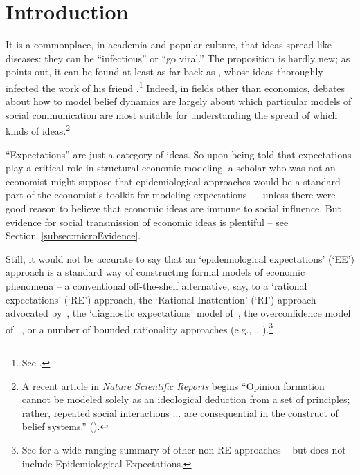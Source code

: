 \section{Introduction}
\label{chap1:sec1}

It is a commonplace, in academia and popular culture, that ideas spread like diseases: they can be ``infectious'' or ``go viral.''  The proposition is hardly new; as \cite{shiller2017narrative} points out, it can be found at least as far back as \cite{humeenquiry}, whose ideas thoroughly infected the work of his friend \cite{smithwealth}.\footnote{See \cite{rasmussen2017infidel}.} Indeed, in fields other than economics, debates about how to model belief dynamics are largely about which particular models of social communication are most suitable for understanding the spread of which kinds of ideas.\footnote{A recent article in \textit{Nature Scientific Reports} begins ``Opinion formation cannot be modeled solely as an ideological deduction from a set of principles; rather, repeated social interactions ... are consequential in the construct of belief systems.'' (\cite{nedic2019graph}).}

``Expectations'' are just a category of ideas.  So upon being told that expectations play a critical role in structural economic modeling, a scholar who was not an economist might suppose that epidemiological approaches would be a standard part of the economist's toolkit for modeling expectations --- unless there were good reason to believe that economic ideas are immune to social influence.  But evidence for social transmission of economic ideas is plentiful -- see Section~\ref{subsec:microEvidence}.

Still, it would not be accurate to say that an `epidemiological expectations' (`EE') approach is a standard way of constructing formal models of economic phenomena -- a conventional off-the-shelf alternative, say, to a `rational expectations' (`RE') approach, the `Rational Inattention' (`RI') approach advocated by~\cite{sims2003implications}, the `diagnostic expectations' model of~\cite{bordalo2018diagnostic}, the overconfidence model of ~\cite{daniel1998investor}, or a number of bounded rationality approaches (e.g.,~\cite{gabaix2020behavioral}, \cite{ilut2020economic}).\footnote{See \cite{hommes2021behavioral} for a wide-ranging summary of other non-RE approaches -- but does not include Epidemiological Expectations.}

